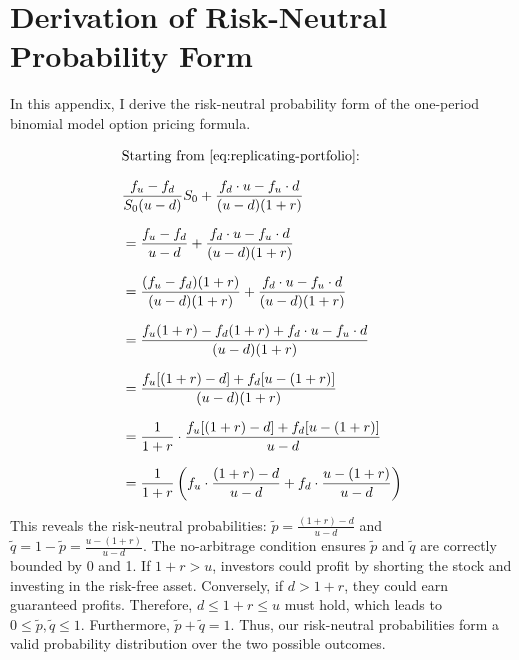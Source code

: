 \documentclass[english,12pt,a4paper,pdftex,sci,utf8]{aaltothesis}
\begin{document}
\appendix
\section{Derivation of Risk-Neutral Probability Form}  %
\label{appendix:risk_neutral_derivation}

In this appendix, I derive the risk-neutral probability form of the one-period binomial model option pricing formula.

\begin{align}
&\text{Starting from \eqref{eq:replicating-portfolio}:} \nonumber\\[0.7em]
&\frac{f_u - f_d}{S_0(u-d)}S_0 + \frac{f_d \cdot u-f_u \cdot d}{(u-d)(1+r)} \nonumber\\[0.7em]
&=\frac{f_u - f_d}{u-d} + \frac{f_d \cdot u-f_u \cdot d}{(u-d)(1+r)} \nonumber\\[0.7em]
&=\frac{(f_u - f_d)(1+r)}{(u-d)(1+r)} + \frac{f_d \cdot u - f_u \cdot d}{(u-d)(1+r)} \nonumber\\[0.7em]
&=\frac{f_u(1+r) - f_d(1+r) + f_d \cdot u - f_u \cdot d}{(u-d)(1+r)} \nonumber\\[0.7em]
&= \frac{f_u[(1+r) - d] + f_d[u - (1+r)]}{(u-d)(1+r)} \nonumber\\[0.7em]
&= \frac{1}{1+r} \cdot \frac{f_u[(1+r) - d] + f_d[u - (1+r)]}{u-d} \nonumber\\[0.7em]
&= \frac{1}{1+r} \left( f_u \cdot \frac{(1+r) - d}{u-d} + f_d \cdot \frac{u - (1+r)}{u-d} \right)\nonumber
\end{align}

This reveals the risk-neutral probabilities: $\tilde p = \frac{(1+r) - d}{u-d}$ and \mbox{$\tilde q=1-\tilde p = \frac{u - (1+r)}{u-d}$}. The no-arbitrage condition ensures $\tilde p$ and $\tilde q$ are correctly bounded by 0 and 1. If $1+r > u$, investors could profit by shorting the stock and investing in the risk-free asset. Conversely, if $d > 1+r$, they could earn guaranteed profits. Therefore, $d \leq 1+r \leq u$ must hold, which leads to $0\leq \tilde p, \tilde q \leq 1$. Furthermore, $\tilde p + \tilde q = 1$. Thus, our risk-neutral probabilities form a valid probability distribution over the two possible outcomes.
\end{document}
